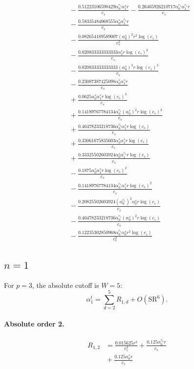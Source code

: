\documentclass[10pt]{article}
\begin{document}
\begin{align*}
&{}  - \frac{0.51223106590429 \alpha_{0}^{c_s} \alpha_{1}^s r}{c_{s}} - \frac{0.26465926210717 \alpha_{0}^{c_s} \alpha_{1}^{c_s} r}{c_{s}} \\
&{}  - \frac{0.58335484068555 \alpha_{0}^s \alpha_{1}^{c_s} r}{c_{s}} \\
&{}  - \frac{0.082654189589007 \left(\alpha_{0}^s\right)^{2} r^{2} \log{\left(c_{s} \right)}}{c_{s}^{2}} \\
&{}  - \frac{0.020833333333333 \alpha_{2}^s r \log{\left(c_{s} \right)}^{3}}{c_{s}} \\
&{}  - \frac{0.020833333333333 \left(\alpha_{0}^s\right)^{3} r \log{\left(c_{s} \right)}^{3}}{c_{s}} \\
&{}  - \frac{0.23087387125098 \alpha_{0}^s \alpha_{1}^s r}{c_{s}} \\
&{}  + \frac{0.0625 \alpha_{0}^s \alpha_{1}^s r \log{\left(c_{s} \right)}^{3}}{c_{s}} \\
&{}  + \frac{0.14189767784134 \alpha_{0}^{c_s} \left(\alpha_{0}^s\right)^{2} r \log{\left(c_{s} \right)}^{2}}{c_{s}} \\
&{}  + \frac{0.46478233218736 \alpha_{0}^{c_s} \alpha_{1}^s r \log{\left(c_{s} \right)}}{c_{s}} \\
&{}  + \frac{0.33061675835603 \alpha_{0}^s \alpha_{1}^s r \log{\left(c_{s} \right)}}{c_{s}} \\
&{}  + \frac{0.33325502603924 \alpha_{0}^s \alpha_{1}^{c_s} r \log{\left(c_{s} \right)}}{c_{s}} \\
&{}  - \frac{0.1875 \alpha_{0}^s \alpha_{1}^s r \log{\left(c_{s} \right)}^{2}}{c_{s}} \\
&{}  - \frac{0.14189767784134 \alpha_{0}^{c_s} \alpha_{1}^s r \log{\left(c_{s} \right)}^{2}}{c_{s}} \\
&{}  - \frac{0.20825502603924 \left(\alpha_{0}^{c_s}\right)^{2} \alpha_{0}^s r \log{\left(c_{s} \right)}}{c_{s}} \\
&{}  - \frac{0.46478233218736 \alpha_{0}^{c_s} \left(\alpha_{0}^s\right)^{2} r \log{\left(c_{s} \right)}}{c_{s}} \\
&{}  - \frac{0.12235302850968 \alpha_{0}^{c_s} \alpha_{0}^s r^{2} \log{\left(c_{s} \right)}}{c_{s}^{2}}
\end{align*}

\subsection{$n=1$}
For $p=3$, the absolute cutoff is $W=5$:
\[\alpha_{1}^t=\sum_{d=2}^{5}R_{1,d}+O(\mathrm{SR}^{6}).\]
\paragraph{Absolute order 2.}
\begin{align*}
R_{1,2} &= \frac{0.015625 r^{2}}{c_{s}^{2}} + \frac{0.125 \alpha_{0}^{c_s} r}{c_{s}} \\
&{}  + \frac{0.125 \alpha_{0}^s r}{c_{s}}
\end{align*}
\end{document}
